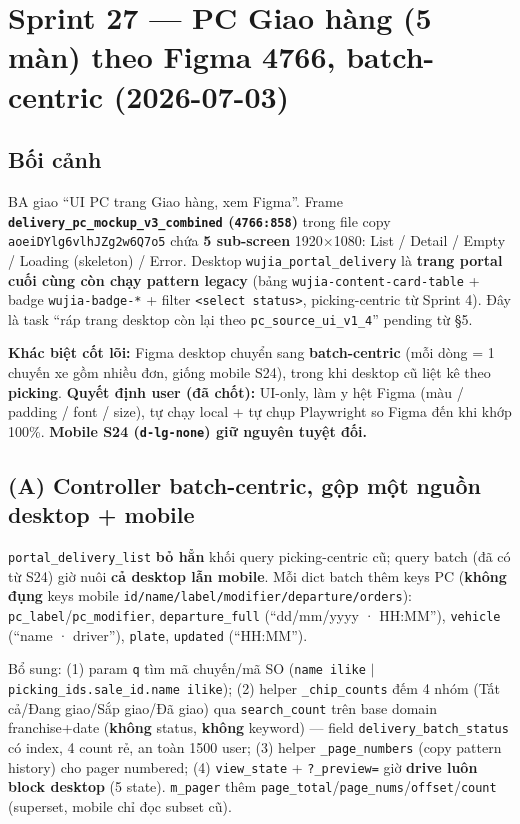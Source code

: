 \chapter{Sprint 27 --- PC Giao hàng (5 màn) theo Figma 4766, batch-centric (2026-07-03)}

\section{Bối cảnh}

BA giao ``UI PC trang Giao hàng, xem Figma''. Frame \textbf{\texttt{delivery\_pc\_mockup\_v3\_combined} (\texttt{4766:858})} trong file copy \texttt{aoeiDYlg6vlhJZg2w6Q7o5} chứa \textbf{5 sub-screen} 1920$\times$1080: List / Detail / Empty / Loading (skeleton) / Error. Desktop \texttt{wujia\_portal\_delivery} là \textbf{trang portal cuối cùng còn chạy pattern legacy} (bảng \texttt{wujia-content-card-table} + badge \texttt{wujia-badge-*} + filter \texttt{<select status>}, picking-centric từ Sprint 4). Đây là task ``ráp trang desktop còn lại theo \texttt{pc\_source\_ui\_v1\_4}'' pending từ §5.

\textbf{Khác biệt cốt lõi:} Figma desktop chuyển sang \textbf{batch-centric} (mỗi dòng = 1 chuyến xe gồm nhiều đơn, giống mobile S24), trong khi desktop cũ liệt kê theo \textbf{picking}. \textbf{Quyết định user (đã chốt):} UI-only, làm y hệt Figma (màu / padding / font / size), tự chạy local + tự chụp Playwright so Figma đến khi khớp 100\%. \textbf{Mobile S24 (\texttt{d-lg-none}) giữ nguyên tuyệt đối.}

\section{(A) Controller batch-centric, gộp một nguồn desktop + mobile}

\texttt{portal\_delivery\_list} \textbf{bỏ hẳn} khối query picking-centric cũ; query batch (đã có từ S24) giờ nuôi \textbf{cả desktop lẫn mobile}. Mỗi dict batch thêm keys PC (\textbf{không đụng} keys mobile \texttt{id/name/label/modifier/departure/orders}): \texttt{pc\_label}/\texttt{pc\_modifier}, \texttt{departure\_full} (``dd/mm/yyyy · HH:MM''), \texttt{vehicle} (``name · driver''), \texttt{plate}, \texttt{updated} (``HH:MM'').

Bổ sung: (1) param \texttt{q} tìm mã chuyến/mã SO (\texttt{name ilike} \(|\) \texttt{picking\_ids.sale\_id.name ilike}); (2) helper \texttt{\_chip\_counts} đếm 4 nhóm (Tất cả/Đang giao/Sắp giao/Đã giao) qua \texttt{search\_count} trên base domain franchise+date (\textbf{không} status, \textbf{không} keyword) --- field \texttt{delivery\_batch\_status} có index, 4 count rẻ, an toàn 1500 user; (3) helper \texttt{\_page\_numbers} (copy pattern history) cho pager numbered; (4) \texttt{view\_state} + \texttt{?\_preview=} giờ \textbf{drive luôn block desktop} (5 state). \texttt{m\_pager} thêm \texttt{page\_total}/\texttt{page\_nums}/\texttt{offset}/\texttt{count} (superset, mobile chỉ đọc subset cũ).

